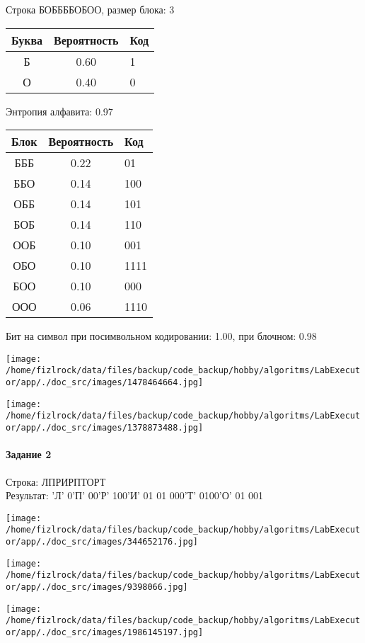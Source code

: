 \documentclass[a4paper, 12pt]{article}
\begin{document}
Строка БОББББОБОО, размер блока: 3
\begin{center}
 \begin{tabular}{ |c|c|l| } 
  \hline
     Буква & Вероятность & Код\\ \hline
Б & 0.60 & 1\\\hline
О & 0.40 & 0
\\ \hline \end{tabular}
\end{center}
Энтропия алфавита: 0.97
\begin{center}
 \begin{tabular}{ |c|c|l| } 
  \hline
     Блок & Вероятность & Код\\ \hline
БББ & 0.22 & 01\\\hline
ББО & 0.14 & 100\\\hline
ОББ & 0.14 & 101\\\hline
БОБ & 0.14 & 110\\\hline
ООБ & 0.10 & 001\\\hline
ОБО & 0.10 & 1111\\\hline
БОО & 0.10 & 000\\\hline
ООО & 0.06 & 1110
\\ \hline \end{tabular}
\end{center}
Бит на символ при посимвольном кодировании: 1.00, при блочном: 0.98

\texttt{[image: /home/fizlrock/data/files/backup/code\_backup/hobby/algoritms/LabExecutor/app/./doc\_src/images/1478464664.jpg]}

\texttt{[image: /home/fizlrock/data/files/backup/code\_backup/hobby/algoritms/LabExecutor/app/./doc\_src/images/1378873488.jpg]}
\pagebreak
\paragraph{Задание 2}

Строка: 
ЛПРИРПТОРТ\\
Результат: 'Л' 0'П' 00'Р' 100'И' 01 01 000'Т' 0100'О' 01 001

\texttt{[image: /home/fizlrock/data/files/backup/code\_backup/hobby/algoritms/LabExecutor/app/./doc\_src/images/344652176.jpg]}

\texttt{[image: /home/fizlrock/data/files/backup/code\_backup/hobby/algoritms/LabExecutor/app/./doc\_src/images/9398066.jpg]}

\texttt{[image: /home/fizlrock/data/files/backup/code\_backup/hobby/algoritms/LabExecutor/app/./doc\_src/images/1986145197.jpg]}
\end{document}
